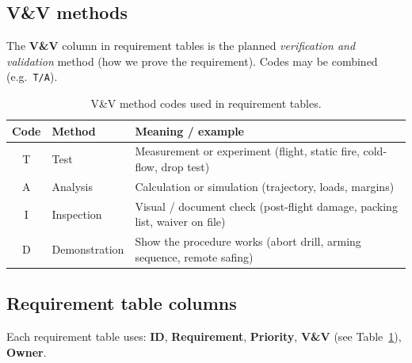 \subsection{V\&V methods}

The \textbf{V\&V} column in requirement tables is the planned
\emph{verification and validation} method (how we prove the requirement).
Codes may be combined (e.g.\ \texttt{T/A}).

\begin{table}[ht]
\centering
\caption{V\&V method codes used in requirement tables.}
\label{tab:vv-methods}
\begin{tabularx}{\linewidth}{@{}c l X@{}}
\toprule
\textbf{Code} & \textbf{Method} & \textbf{Meaning / example} \\
\midrule
T & Test & Measurement or experiment (flight, static fire, cold-flow, drop test) \\
A & Analysis & Calculation or simulation (trajectory, loads, margins) \\
I & Inspection & Visual / document check (post-flight damage, packing list, waiver on file) \\
D & Demonstration & Show the procedure works (abort drill, arming sequence, remote safing) \\
\bottomrule
\end{tabularx}
\end{table}

\subsection{Requirement table columns}

Each requirement table uses: \textbf{ID}, \textbf{Requirement}, \textbf{Priority},
\textbf{V\&V} (see Table~\ref{tab:vv-methods}), \textbf{Owner}.
